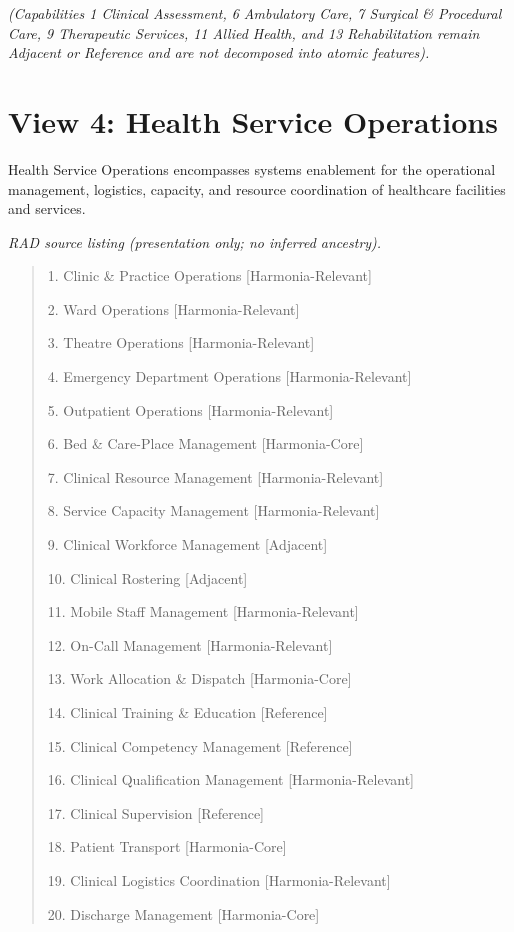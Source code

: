 \emph{(Capabilities 1 Clinical Assessment, 6 Ambulatory Care, 7 Surgical \& Procedural Care, 9 Therapeutic Services, 11 Allied Health, and 13 Rehabilitation remain Adjacent or Reference and are not decomposed into atomic features).}

\label{rad:enabling:441}

\par\smallskip
{}\label{rad:enabling:443}
\section*{View 4: Health Service Operations}
\label{rad:enabling:445}

Health Service Operations encompasses systems enablement for the operational management, logistics, capacity, and resource coordination of healthcare facilities and services.

\label{rad:enabling:447}

\textit{RAD source listing (presentation only; no inferred ancestry).}
\begin{quote}
1. Clinic \& Practice Operations [Harmonia-Relevant]

2. Ward Operations [Harmonia-Relevant]

3. Theatre Operations [Harmonia-Relevant]

4. Emergency Department Operations [Harmonia-Relevant]

5. Outpatient Operations [Harmonia-Relevant]

6. Bed \& Care-Place Management [Harmonia-Core]

7. Clinical Resource Management [Harmonia-Relevant]

8. Service Capacity Management [Harmonia-Relevant]

9. Clinical Workforce Management [Adjacent]

10. Clinical Rostering [Adjacent]

11. Mobile Staff Management [Harmonia-Relevant]

12. On-Call Management [Harmonia-Relevant]

13. Work Allocation \& Dispatch [Harmonia-Core]

14. Clinical Training \& Education [Reference]

15. Clinical Competency Management [Reference]

16. Clinical Qualification Management [Harmonia-Relevant]

17. Clinical Supervision [Reference]

18. Patient Transport [Harmonia-Core]

19. Clinical Logistics Coordination [Harmonia-Relevant]

20. Discharge Management [Harmonia-Core]
\end{quote}
\label{rad:enabling:470}
